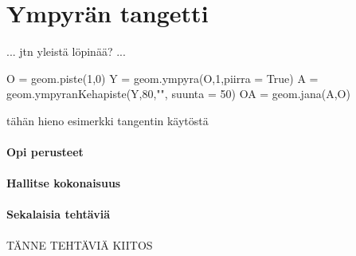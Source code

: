 \section*{Ympyrän tangetti}

... jtn yleistä löpinää? ...


\begin{kuva}
O = geom.piste(1,0)
Y = geom.ympyra(O,1,piirra = True)
A = geom.ympyranKehapiste(Y,80,"", suunta = 50)
OA = geom.jana(A,O)

\end{kuva}

\begin{esimerkki}

tähän hieno esimerkki tangentin käytöstä

\end{esimerkki}

\paragraph*{Opi perusteet}

\paragraph*{Hallitse kokonaisuus}

\paragraph*{Sekalaisia tehtäviä}

TÄNNE TEHTÄVIÄ KIITOS

